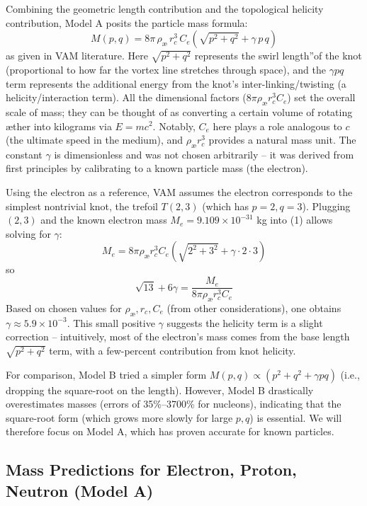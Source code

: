 Combining the geometric length contribution and the topological helicity contribution, Model A posits the particle mass formula:
\begin{equation}
    \boxed{  M(p,q) = 8\pi\,\rho_{\text{\ae}}\,r_c^3\,C_e \left(\sqrt{p^2 + q^2} + \gamma\, p\,q\right)     }
\end{equation}
as given in VAM literature. Here $\sqrt{p^2+q^2}$ represents the \grqq swirl length\textquotedblright of the knot (proportional to how far the vortex line stretches through space), and the $\gamma p q$ term represents the additional energy from the knot's inter-linking/twisting (a helicity/interaction term). All the dimensional factors ($8\pi \rho_{\text{\ae}} r_c^3 C_e$) set the overall scale of mass; they can be thought of as converting a certain volume of rotating æther into kilograms via $E=mc^2$. Notably, $C_e$ here plays a role analogous to $c$ (the ultimate speed in the medium), and $\rho_{\text{\ae}} r_c^3$ provides a natural mass unit. The constant $\gamma$ is dimensionless and was not chosen arbitrarily – it was derived from first principles by calibrating to a known particle mass (the electron).

Using the electron as a reference, VAM assumes the electron corresponds to the simplest nontrivial knot, the trefoil $T(2,3)$ (which has $p=2,q=3$). Plugging $(2,3)$ and the known electron mass $M_e = 9.109\times10^{-31}$ kg into (1) allows solving for $\gamma$:
\[
    M_e = 8\pi \rho_{\text{\ae}} r_c^3 C_e \left(\sqrt{2^2+3^2} + \gamma \cdot 2\cdot3\right)
\]
so
\[
    \sqrt{13} + 6\gamma = \frac{M_e}{8\pi \rho_{\text{\ae}} r_c^3 C_e}
\]
Based on chosen values for $\rho_{\text{\ae}}, r_c, C_e$ (from other considerations), one obtains $\gamma \approx 5.9\times10^{-3}$. This small positive $\gamma$ suggests the helicity term is a slight correction -- intuitively, most of the electron's mass comes from the base length $\sqrt{p^2+q^2}$ term, with a few-percent contribution from knot helicity.

For comparison, Model B tried a simpler form $M(p,q) \propto (p^2 + q^2 + \gamma p q)$ (i.e., dropping the square-root on the length). However, Model B drastically overestimates masses (errors of 35\%--3700\% for nucleons), indicating that the square-root form (which grows more slowly for large $p,q$) is essential. We will therefore focus on Model A, which has proven accurate for known particles.

\subsection{Mass Predictions for Electron, Proton, Neutron (Model A)}

